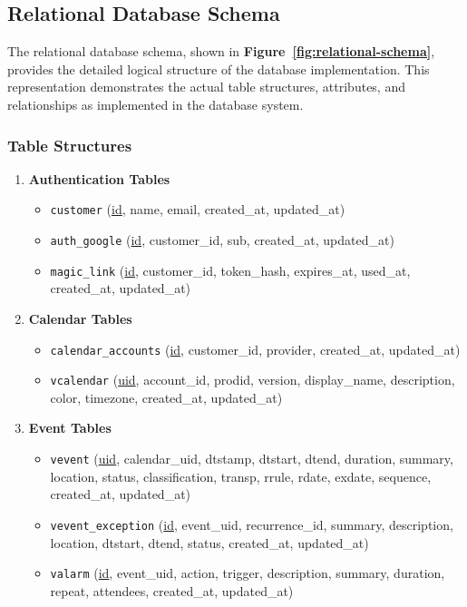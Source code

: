 \subsection{Relational Database Schema}

The relational database schema, shown in \textbf{Figure~\ref{fig:relational-schema}}, provides the detailed logical structure of the database implementation. This representation demonstrates the actual table structures, attributes, and relationships as implemented in the database system.

\subsubsection{Table Structures}

\begin{enumerate}
    \item \textbf{Authentication Tables}
          \begin{itemize}
              \item \texttt{customer} (\underline{id}, name, email, created\_at, updated\_at)
              \item \texttt{auth\_google} (\underline{id}, customer\_id, sub, created\_at, updated\_at)
              \item \texttt{magic\_link} (\underline{id}, customer\_id, token\_hash, expires\_at, used\_at, created\_at, updated\_at)
          \end{itemize}

    \item \textbf{Calendar Tables}
          \begin{itemize}
              \item \texttt{calendar\_accounts} (\underline{id}, customer\_id, provider, created\_at, updated\_at)
              \item \texttt{vcalendar} (\underline{uid}, account\_id, prodid, version, display\_name, description, color, timezone, created\_at, updated\_at)
          \end{itemize}

    \item \textbf{Event Tables}
          \begin{itemize}
              \item \texttt{vevent} (\underline{uid}, calendar\_uid, dtstamp, dtstart, dtend, duration, summary, location, status, classification, transp, rrule, rdate, exdate, sequence, created\_at, updated\_at)
              \item \texttt{vevent\_exception} (\underline{id}, event\_uid, recurrence\_id, summary, description, location, dtstart, dtend, status, created\_at, updated\_at)
              \item \texttt{valarm} (\underline{id}, event\_uid, action, trigger, description, summary, duration, repeat, attendees, created\_at, updated\_at)
          \end{itemize}
\end{enumerate}

